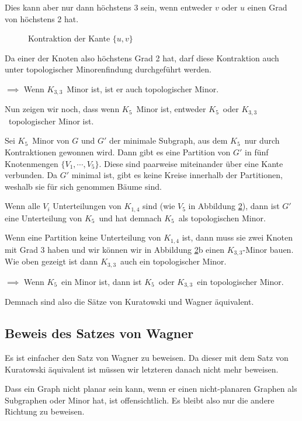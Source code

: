 \documentclass[10pt,a4paper]{article}
\makeatletter
\def\maxwidth#1{\ifdim\Gin@nat@width>#1 #1\else\Gin@nat@width\fi}
\newcommand{\imageFigureMult}[6]{%
    \imageFigureMultS{#1}{#2}{#3}{#4}{#5}{#6}{0.45}%
}
\newcommand{\imageFigureMultS}[7]{%
    \begin{figure}[h]%
        \centering
        \subfloat[#1]{{\texttt{[image: \#2]} }}%
        \qquad
        \subfloat[#3]{{\texttt{[image: \#4]} }}%
        \caption{#5}%
        \label{fig:#6}%
    \end{figure}
}
\newcommand{\Kf}{$K_5$}
\newcommand{\Kdd}{$K_{3,3}$}
\makeatother
\begin{document}
Dies kann aber nur dann höchstens 3 sein, wenn entweder $v$ oder $u$ einen Grad
von höchstens 2 hat.

\imageFigureMultS{$uv$ hat danach Rang 3}{eq-contr.png}{$uv$ hat hier auch Rang 3}{eq-contr2.png}{Kontraktion der Kante $\{u, v\}$}{eq-contr}{.3}

Da einer der Knoten also höchstens Grad 2 hat, darf diese Kontraktion auch
unter topologischer Minorenfindung durchgeführt werden.

$\implies$ Wenn \Kdd~Minor ist, ist er auch topologischer Minor.

Nun zeigen wir noch, dass wenn \Kf~Minor ist, entweder \Kf~oder
\Kdd~topologischer Minor ist.

Sei \Kf~Minor von $G$ und $G'$ der minimale Subgraph, aus dem \Kf~nur durch
Kontraktionen gewonnen wird.
Dann gibt es eine Partition von $G'$ in fünf Knotenmengen $\{V_1, \cdots,
V_5\}$.
Diese sind paarweise miteinander über eine Kante verbunden.
Da $G'$ minimal ist, gibt es keine Kreise innerhalb der Partitionen, weshalb
sie für sich genommen Bäume sind.

Wenn alle $V_i$ Unterteilungen von $K_{1,4}$ sind (wie $V_5$ in Abbildung
\ref{fig:minor-to-top}), dann ist $G'$ eine Unterteilung von \Kf~und hat
demnach \Kf~als topologischen Minor.

Wenn eine Partition keine Unterteilung von $K_{1,4}$ ist, dann muss sie zwei
Knoten mit Grad 3 haben und wir können wir in Abbildung \ref{fig:minor-to-top}b
einen \Kdd-Minor bauen.
Wie oben gezeigt ist dann \Kdd~auch ein topologischer Minor.

$\implies$ Wenn \Kf~ein Minor ist, dann ist \Kf~oder \Kdd~ein topologischer
Minor.

\imageFigureMult{}{minor-to-top1.png}{}{minor-to-top2.png}{}{minor-to-top}

Demnach sind also die Sätze von Kuratowski und Wagner äquivalent.

\subsection{Beweis des Satzes von Wagner}
Es ist einfacher den Satz von Wagner zu beweisen.
Da dieser mit dem Satz von Kuratowski äquivalent ist müssen wir letzteren
danach nicht mehr beweisen.

Dass ein Graph nicht planar sein kann, wenn er einen nicht-planaren Graphen als
Subgraphen oder Minor hat, ist offensichtlich.
Es bleibt also nur die andere Richtung zu beweisen.
\end{document}
